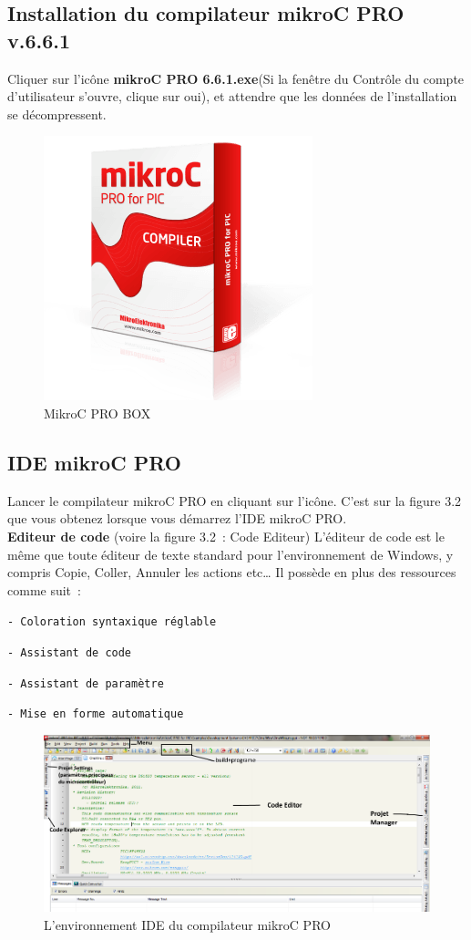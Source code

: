 \documentclass[a4paper, 12pt]{book}
\begin{document}
\subsection{Installation du compilateur mikroC PRO v.6.6.1}
Cliquer sur l'icône \textbf{mikroC PRO 6.6.1.exe}(Si la fenêtre du Contrôle du compte d’utilisateur s’ouvre, clique sur oui), et attendre que les données de l’installation se décompressent.\\
\begin{figure}[htbp]
  \centering
  \includegraphics[width=0.5\linewidth]{images/mikroc_pro_pic_box.png}
  \caption{MikroC PRO BOX}
\end{figure}

\subsection{IDE mikroC PRO}
Lancer le compilateur mikroC PRO en cliquant sur l’icône. C’est sur la figure 3.2 que vous obtenez lorsque vous démarrez l’IDE mikroC PRO.\\

\textbf{Editeur de code} (voire la figure 3.2~: Code Editeur)
L’éditeur de code est le même que toute éditeur de texte standard pour l’environnement de 
Windows, y compris Copie, Coller, Annuler les actions etc… Il possède en plus des ressources comme suit~: 
\begin{description}
\item \texttt{- Coloration syntaxique réglable}
\item \texttt{- Assistant de code}
\item \texttt{- Assistant de paramètre}
\item \texttt{- Mise en forme automatique}
\end{description}
\begin{figure}[htbp]
  \centering
  \includegraphics[width=1.0\linewidth]{images/mikroC_PRO_for_PIC.png}
  \caption{L'environnement IDE du compilateur mikroC PRO\label{fig-bmp}}
\end{figure}
\end{document}
